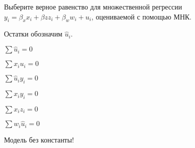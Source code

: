 
\begin{question}
Выберите верное равенство для множественной регрессии \(y_i = \beta_x x_i + \beta z z_i + \beta_w w_i + u_i\), оцениваемой с помощью МНК.

Остатки обозначим \(\hat u_i\).
\begin{answerlist}
  \item \(\sum \hat u_i = 0\)
  \item \(\sum x_i u_i = 0\)
  \item \(\sum \hat u_i y_i = 0\)
  \item \(\sum x_i y_i = 0\)
  \item \(\sum x_i z_i = 0\)
  \item \(\sum w_i \hat u_i = 0\)
\end{answerlist}
\end{question}

\begin{solution}
Модель без константы!
\end{solution}

